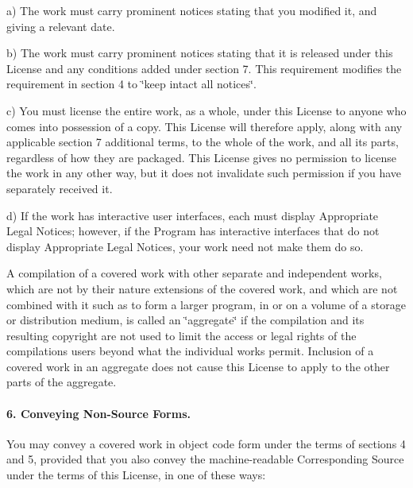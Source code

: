 \begin{DoxyItemize}
\item a) The work must carry prominent notices stating that you modified it, and giving a relevant date.
\item b) The work must carry prominent notices stating that it is released under this License and any conditions added under section 7. This requirement modifies the requirement in section 4 to \char`\"{}keep intact all notices\char`\"{}.
\item c) You must license the entire work, as a whole, under this License to anyone who comes into possession of a copy. This License will therefore apply, along with any applicable section 7 additional terms, to the whole of the work, and all its parts, regardless of how they are packaged. This License gives no permission to license the work in any other way, but it does not invalidate such permission if you have separately received it.
\item d) If the work has interactive user interfaces, each must display Appropriate Legal Notices; however, if the Program has interactive interfaces that do not display Appropriate Legal Notices, your work need not make them do so.
\end{DoxyItemize}

A compilation of a covered work with other separate and independent works, which are not by their nature extensions of the covered work, and which are not combined with it such as to form a larger program, in or on a volume of a storage or distribution medium, is called an \char`\"{}aggregate\char`\"{} if the compilation and its resulting copyright are not used to limit the access or legal rights of the compilation\textquotesingle{}s users beyond what the individual works permit. Inclusion of a covered work in an aggregate does not cause this License to apply to the other parts of the aggregate.

\paragraph*{6. Conveying Non-\/\+Source Forms.}

You may convey a covered work in object code form under the terms of sections 4 and 5, provided that you also convey the machine-\/readable Corresponding Source under the terms of this License, in one of these ways\+:


